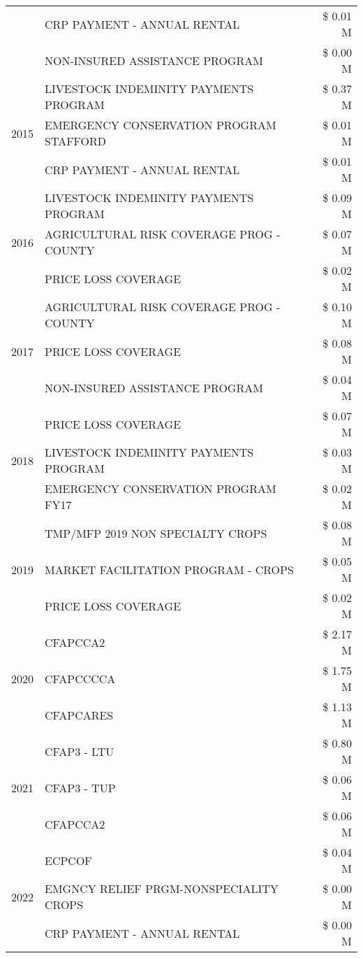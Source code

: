 \begin{tabular}{llr}
 & CRP PAYMENT - ANNUAL RENTAL & \$ 0.01 M \\
 & NON-INSURED ASSISTANCE PROGRAM & \$ 0.00 M \\
\cline{1-3}
\multirow[t]{3}{*}{2015} & LIVESTOCK INDEMINITY PAYMENTS PROGRAM & \$ 0.37 M \\
 & EMERGENCY CONSERVATION PROGRAM STAFFORD & \$ 0.01 M \\
 & CRP PAYMENT - ANNUAL RENTAL & \$ 0.01 M \\
\cline{1-3}
\multirow[t]{3}{*}{2016} & LIVESTOCK INDEMINITY PAYMENTS PROGRAM & \$ 0.09 M \\
 & AGRICULTURAL RISK COVERAGE PROG - COUNTY & \$ 0.07 M \\
 & PRICE LOSS COVERAGE & \$ 0.02 M \\
\cline{1-3}
\multirow[t]{3}{*}{2017} & AGRICULTURAL RISK COVERAGE PROG - COUNTY & \$ 0.10 M \\
 & PRICE LOSS COVERAGE & \$ 0.08 M \\
 & NON-INSURED ASSISTANCE PROGRAM & \$ 0.04 M \\
\cline{1-3}
\multirow[t]{3}{*}{2018} & PRICE LOSS COVERAGE & \$ 0.07 M \\
 & LIVESTOCK INDEMINITY PAYMENTS PROGRAM & \$ 0.03 M \\
 & EMERGENCY CONSERVATION PROGRAM FY17 & \$ 0.02 M \\
\cline{1-3}
\multirow[t]{3}{*}{2019} & TMP/MFP 2019 NON SPECIALTY CROPS & \$ 0.08 M \\
 & MARKET FACILITATION PROGRAM - CROPS & \$ 0.05 M \\
 & PRICE LOSS COVERAGE & \$ 0.02 M \\
\cline{1-3}
\multirow[t]{3}{*}{2020} & CFAPCCA2 & \$ 2.17 M \\
 & CFAPCCCCA & \$ 1.75 M \\
 & CFAPCARES & \$ 1.13 M \\
\cline{1-3}
\multirow[t]{3}{*}{2021} & CFAP3 - LTU & \$ 0.80 M \\
 & CFAP3 - TUP & \$ 0.06 M \\
 & CFAPCCA2 & \$ 0.06 M \\
\cline{1-3}
\multirow[t]{3}{*}{2022} & ECPCOF & \$ 0.04 M \\
 & EMGNCY RELIEF PRGM-NONSPECIALITY CROPS & \$ 0.00 M \\
 & CRP PAYMENT - ANNUAL RENTAL & \$ 0.00 M \\
\cline{1-3}
\bottomrule
\end{tabular}
